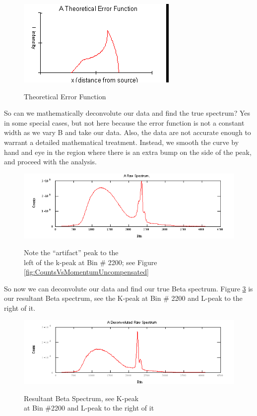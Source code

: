 \documentclass{../lab}
\begin{document}
\begin{figure}[h]
    \centering
    \href{http://experimentationlab.berkeley.edu/sites/default/files/images/BRAimage040.gif}{\includegraphics[width=0.5\linewidth]{images/BRAimage040.png}}
    \caption{Theoretical Error Function}
    \label{fig:TheoreticalErrorFunction}
\end{figure}

So can we mathematically deconvolute our data and find the true spectrum? Yes in some special cases, but not here because the error function is not a constant width as we vary B and take our data. Also, the data are not accurate enough to warrant a detailed mathematical treatment. Instead, we smooth the curve by hand and eye in the region where there is an extra bump on the side of the peak, and proceed with the analysis.

\begin{figure}[h]
    \centering
    \href{http://experimentationlab.berkeley.edu/sites/default/files/images/BRAimage041.gif}{\includegraphics[width=0.5\linewidth]{images/BRAimage041.png}}
    \caption{Note the ``artifact'' peak to the\\ left of the k-peak at Bin \# 2200; see Figure \ref{fig:CountsVsMomentumUncompensated}}
    \label{fig:RawSpectrum}
\end{figure}

So now we can deconvolute our data and find our true Beta spectrum. Figure \ref{fig:DeconvolutedRawSpectrum} is our resultant Beta spectrum, see the K-peak at Bin \# 2200 and L-peak to the right of it.

\begin{figure}[h]
    \centering
    \href{http://experimentationlab.berkeley.edu/sites/default/files/images/BRAimage042.gif}{\includegraphics[width=0.5\linewidth]{images/BRAimage042.png}}
    \caption{Resultant Beta Spectrum, see K-peak \\at Bin \#2200 and L-peak to the right of it}
    \label{fig:DeconvolutedRawSpectrum}
\end{figure}
\end{document}
